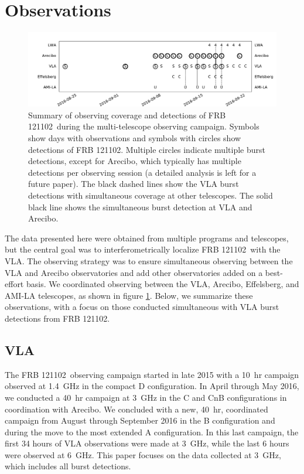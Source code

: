 \documentclass[twocolumn]{aastex61}
\newcommand{\frb}{FRB 121102}
\begin{document}
\section{Observations}

\begin{figure}[t]
\begin{center}
\includegraphics[width=2\columnwidth]{timeline}
\caption{Summary of observing coverage and detections of \frb\ during the multi-telescope observing campaign. Symbols show days with observations and symbols with circles show detections of \frb. Multiple circles indicate multiple burst detections, except for Arecibo, which typically has multiple detections per observing session (a detailed analysis is left for a future paper). The black dashed lines show the VLA burst detections with simultaneous coverage at other telescopes. The solid black line shows the simultaneous burst detection at VLA and Arecibo.
\label{fig:multi}}
\end{center}
\end{figure}

The data presented here were obtained from multiple programs and telescopes, but the central goal was to interferometrically localize \frb\ with the VLA. The observing strategy was to ensure simultaneous observing between the VLA and Arecibo observatories and add other observatories added on a best-effort basis. We coordinated observing between the VLA, Arecibo, Effelsberg, and AMI-LA telescopes, as shown in figure \ref{fig:multi}. Below, we summarize these observations, with a focus on those conducted simultaneous with VLA burst detections from \frb.

\subsection{VLA}
The \frb\ observing campaign started in late 2015 with a 10~hr campaign observed at 1.4~GHz in the compact D configuration. In April through May 2016, we conducted a 40~hr campaign at 3~GHz in the C and CnB configurations in coordination with Arecibo. We concluded with a new, 40~hr, coordinated campaign from August through September 2016 in the B configuration and during the move to the most extended A configuration. In this last campaign, the first 34 hours of VLA observations were made at 3~GHz, while the last 6 hours were observed at 6~GHz. This paper focuses on the data collected at 3~GHz, which includes all burst detections.
\end{document}

